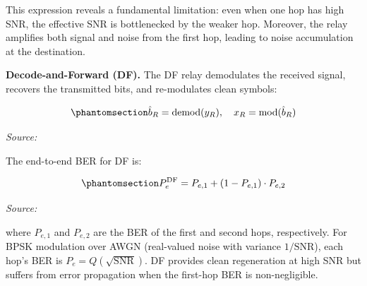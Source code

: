 This expression reveals a fundamental limitation: even when one hop has high SNR, the effective SNR is bottlenecked by the weaker hop. Moreover, the relay amplifies both signal and noise from the first hop, leading to noise accumulation at the destination.

\textbf{Decode-and-Forward (DF).} The DF relay demodulates the received signal, recovers the transmitted bits, and re-modulates clean symbols:

\begin{equation}\protect\phantomsection\label{eq:df-demod-remod}{\hat{b}_R = \text{demod}(y_R), \quad x_R = \text{mod}(\hat{b}_R)
}\end{equation} \par{\small\textit{Source: \cite{laneman2004cooperative}}}

The end-to-end BER for DF is:

\begin{equation}\protect\phantomsection\label{eq:df-ber-hops}{P_e^{\text{DF}} = P_{e,1} + (1 - P_{e,1}) \cdot P_{e,2}
}\end{equation} \par{\small\textit{Source: \cite{laneman2004cooperative, proakis2008digital}}}

where \(P_{e,1}\) and \(P_{e,2}\) are the BER of the first and second hops, respectively. For BPSK modulation over AWGN (real-valued noise with variance \(1/\text{SNR}\)), each hop's BER is \(P_e = Q\left(\sqrt{\text{SNR}}\right)\). DF provides clean regeneration at high SNR but suffers from error propagation when the first-hop BER is non-negligible.

